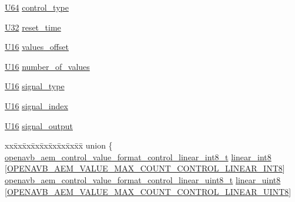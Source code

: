 \begin{DoxyCompactItemize}
\item 
\hyperlink{openavb__types__base__pub_8h_a25809e0734a149248fcf5831efa4e33d}{U64} \hyperlink{structopenavb__aem__descriptor__control__t_af50246c5cfea864b4f3560ae16791102}{control\+\_\+type}
\item 
\hyperlink{openavb__types__base__pub_8h_a696390429f2f3b644bde8d0322a24124}{U32} \hyperlink{structopenavb__aem__descriptor__control__t_ac66282d13a3cb11e30f6b05985f8c93f}{reset\+\_\+time}
\item 
\hyperlink{openavb__types__base__pub_8h_a0a0a322d5fa4a546d293a77ba8b4a71f}{U16} \hyperlink{structopenavb__aem__descriptor__control__t_ad69fe1c7733ef7b567a0cde7ea97035d}{values\+\_\+offset}
\item 
\hyperlink{openavb__types__base__pub_8h_a0a0a322d5fa4a546d293a77ba8b4a71f}{U16} \hyperlink{structopenavb__aem__descriptor__control__t_a90bbd0467ca7ca1836b356ab4d67d8f2}{number\+\_\+of\+\_\+values}
\item 
\hyperlink{openavb__types__base__pub_8h_a0a0a322d5fa4a546d293a77ba8b4a71f}{U16} \hyperlink{structopenavb__aem__descriptor__control__t_a51ba5fdff9933eb274b46b67185d1c7b}{signal\+\_\+type}
\item 
\hyperlink{openavb__types__base__pub_8h_a0a0a322d5fa4a546d293a77ba8b4a71f}{U16} \hyperlink{structopenavb__aem__descriptor__control__t_ad948e7e79bb182b81a76a51c3d6ee9ed}{signal\+\_\+index}
\item 
\hyperlink{openavb__types__base__pub_8h_a0a0a322d5fa4a546d293a77ba8b4a71f}{U16} \hyperlink{structopenavb__aem__descriptor__control__t_a6a464d21574d97691ea70c2037ff8f6f}{signal\+\_\+output}
\item 
\begin{tabbing}
xx\=xx\=xx\=xx\=xx\=xx\=xx\=xx\=xx\=\kill
union \{\\
\>\hyperlink{structopenavb__aem__control__value__format__control__linear__int8__t}{openavb\_aem\_control\_value\_format\_control\_linear\_int8\_t} \hyperlink{structopenavb__aem__descriptor__control__t_ae52b5b765d4c601097136737bba559bf}{linear\_int8} \mbox{[}\hyperlink{openavb__aem__types__pub_8h_ad575315ad30a52b9095a9c75a9abc2bb}{OPENAVB\_AEM\_VALUE\_MAX\_COUNT\_CONTROL\_LINEAR\_INT8}\mbox{]}\\
\>\hyperlink{structopenavb__aem__control__value__format__control__linear__uint8__t}{openavb\_aem\_control\_value\_format\_control\_linear\_uint8\_t} \hyperlink{structopenavb__aem__descriptor__control__t_ae2807d5212b63bd9e52b59125f6ee00c}{linear\_uint8} \mbox{[}\hyperlink{openavb__aem__types__pub_8h_a10723b8b51aeafeae5cbe0190b623562}{OPENAVB\_AEM\_VALUE\_MAX\_COUNT\_CONTROL\_LINEAR\_UINT8}\mbox{]}\\

\end{tabbing}
\end{DoxyCompactItemize}
